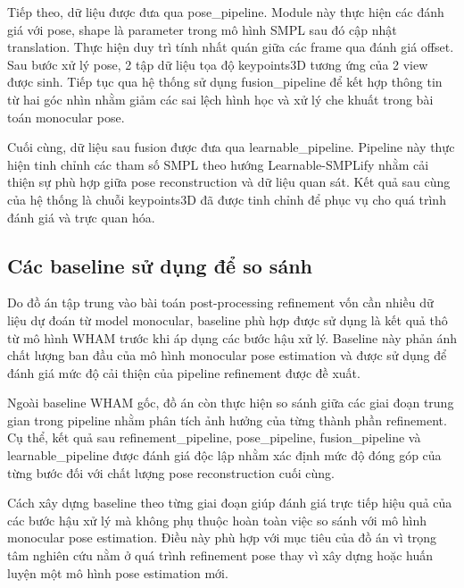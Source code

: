 \documentclass[../DoAn.tex]{subfiles}
\begin{document}
Tiếp theo, dữ liệu được đưa qua pose\_pipeline. Module này thực hiện các đánh giá với pose, shape là parameter trong mô hình SMPL sau đó cập nhật translation. Thực hiện duy trì tính nhất quán giữa các frame qua đánh giá offset. Sau bước xử lý pose, 2 tập dữ liệu tọa độ keypoints3D tương ứng của 2 view được sinh. Tiếp tục qua hệ thống sử dụng fusion\_pipeline để kết hợp thông tin từ hai góc nhìn nhằm giảm các sai lệch hình học và xử lý che khuất trong bài toán monocular pose.

Cuối cùng, dữ liệu sau fusion được đưa qua learnable\_pipeline. Pipeline này thực hiện tinh chỉnh các tham số SMPL theo hướng Learnable-SMPLify nhằm cải thiện sự phù hợp giữa pose reconstruction và dữ liệu quan sát. Kết quả sau cùng của hệ thống là chuỗi keypoints3D đã được tinh chỉnh để phục vụ cho quá trình đánh giá và trực quan hóa.

\subsection{Các baseline sử dụng để so sánh}

Do đồ án tập trung vào bài toán post-processing refinement vốn cần nhiều dữ liệu dự đoán từ model monocular, baseline phù hợp được sử dụng là kết quả thô từ mô hình WHAM trước khi áp dụng các bước hậu xử lý. Baseline này phản ánh chất lượng ban đầu của mô hình monocular pose estimation và được sử dụng để đánh giá mức độ cải thiện của pipeline refinement được đề xuất.

Ngoài baseline WHAM gốc, đồ án còn thực hiện so sánh giữa các giai đoạn trung gian trong pipeline nhằm phân tích ảnh hưởng của từng thành phần refinement. Cụ thể, kết quả sau refinement\_pipeline, pose\_pipeline, fusion\_pipeline và learnable\_pipeline được đánh giá độc lập nhằm xác định mức độ đóng góp của từng bước đối với chất lượng pose reconstruction cuối cùng.

Cách xây dựng baseline theo từng giai đoạn giúp đánh giá trực tiếp hiệu quả của các bước hậu xử lý mà không phụ thuộc hoàn toàn việc so sánh với mô hình monocular pose estimation. Điều này phù hợp với mục tiêu của đồ án vì trọng tâm nghiên cứu nằm ở quá trình refinement pose thay vì xây dựng hoặc huấn luyện một mô hình pose estimation mới.
\end{document}

